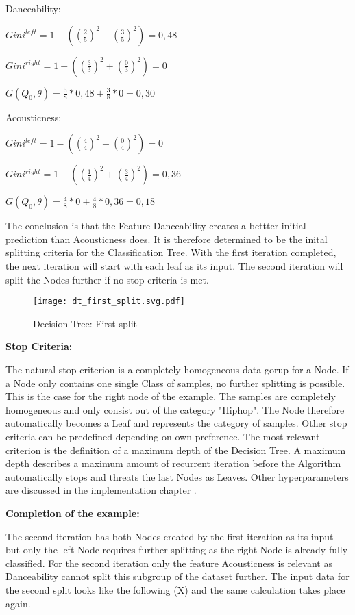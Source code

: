Danceability: 

\(Gini^{left} = 1 - ((\frac{2}{5})^2 + (\frac{3}{5})^2) = 0,48 \)

\(Gini^{right}  = 1 - ((\frac{3}{3})^2 + (\frac{0}{3})^2) = 0 \)

\(G(Q_{0},\theta) = \frac{5}{8} * 0,48 + \frac{3}{8} * 0 = 0,30 \)

Acousticness: 

\(Gini^{left}  = 1 - ((\frac{4}{4})^2 + (\frac{0}{4})^2) = 0 \)

\(Gini^{right} = 1 - ((\frac{1}{4})^2 + (\frac{3}{4})^2) = 0,36 \)

\(G(Q_{0},\theta) = \frac{4}{8} * 0 + \frac{4}{8} * 0,36 = 0,18 \)

The conclusion is that the Feature Danceability creates a bettter initial prediction than Acousticness does. It is therefore 
determined to be the inital splitting criteria for the Classification Tree. With the first iteration completed, the next iteration
will start with each leaf as its input. The second iteration will split the Nodes further if no stop criteria is met. 

\begin{figure}[H]
    \centering
    \caption[]{Decision Tree: First split}
	\label{fig:dt_first_split}
    \texttt{[image: dt\_first\_split.svg.pdf]}
\end{figure}

\textbf{Stop Criteria:}

The natural stop criterion is a completely homogeneous data-gorup for a Node. If a Node only contains one single 
Class of samples, no further splitting is possible. This is the case for the right node of the example. The samples are completely
homogeneous and only consist out of the category "Hiphop". The Node therefore automatically becomes a Leaf and represents the 
category of samples. Other stop criteria can be predefined depending on own preference. The most relevant criterion is the 
definition of a maximum depth of the Decision Tree. A maximum depth describes a maximum amount of recurrent iteration before 
the Algorithm automatically stops and threats the last Nodes as Leaves. Other hyperparameters are discussed in the implementation 
chapter \cite[p.7]{lewis2000introduction}. 

\textbf{Completion of the example:}

The second iteration has both Nodes created by the first iteration as its input but only the left Node requires further splitting as 
the right Node is already fully classified. For the second iteration only the feature Acousticness is relevant as Danceability cannot 
split this subgroup of the dataset further. The input data for the second split looks like the following (X) and the same calculation 
takes place again. 

